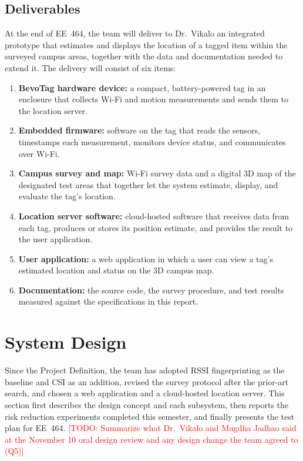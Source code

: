 \documentclass[12pt,letterpaper]{article}
\newcommand{\TODO}[1]{\textcolor{red}{[TODO: #1]}}
\begin{document}
\subsection{Deliverables}
At the end of EE~464, the team will deliver to Dr.\ Vikalo an integrated prototype that estimates
and displays the location of a tagged item within the surveyed campus areas, together with the data
and documentation needed to extend it. The delivery will consist of six items:
\begin{enumerate}
  \item \textbf{BevoTag hardware device:} a compact, battery-powered tag in an enclosure that
    collects Wi-Fi and motion measurements and sends them to the location server.
  \item \textbf{Embedded firmware:} software on the tag that reads the sensors, timestamps each
    measurement, monitors device status, and communicates over Wi-Fi.
  \item \textbf{Campus survey and map:} Wi-Fi survey data and a digital 3D map of the designated
    test areas that together let the system estimate, display, and evaluate the tag's location.
  \item \textbf{Location server software:} cloud-hosted software that receives data from each tag,
    produces or stores its position estimate, and provides the result to the user application.
  \item \textbf{User application:} a web application in which a user can view a tag's estimated
    location and status on the 3D campus map.
  \item \textbf{Documentation:} the source code, the survey procedure, and test results measured
    against the specifications in this report.
\end{enumerate}

\section{System Design}\label{sec:design}
Since the Project Definition, the team has adopted RSSI fingerprinting as the baseline and CSI as an
addition, revised the survey protocol after the prior-art search, and chosen a web application and a
cloud-hosted location server. This section first describes
the design concept and each subsystem, then reports the risk reduction experiments completed this
semester, and finally presents the test plan for EE~464. \TODO{Summarize what Dr.\ Vikalo and
Mugdha Jadhao said at the November 10 oral design review and any design change the team agreed to
(Q5)}
\end{document}
